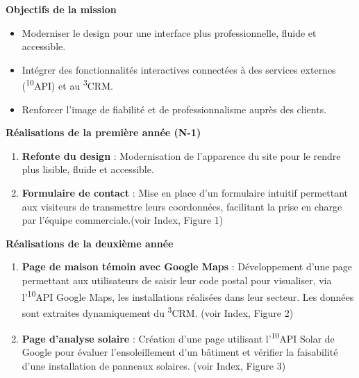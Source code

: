 \textbf{Objectifs de la mission}\vspace{0.3cm}

\begin{itemize}
    \item Moderniser le design pour une interface plus professionnelle, fluide et accessible.\vspace{0.3cm}
    \item Intégrer des fonctionnalités interactives connectées à des services externes (\textsuperscript{10}API) et au \textsuperscript{3}CRM.\vspace{0.3cm}
    \item Renforcer l’image de fiabilité et de professionnalisme auprès des clients.\vspace{0.3cm}
\end{itemize}

\textbf{Réalisations de la première année (N-1)}\vspace{0.3cm}

\begin{enumerate}
    \item \textbf{Refonte du design} : Modernisation de l’apparence du site pour le rendre plus lisible, fluide et accessible.\vspace{0.3cm}
    \item \textbf{Formulaire de contact} : Mise en place d’un formulaire intuitif permettant aux visiteurs de transmettre leurs coordonnées, facilitant la prise en charge par l’équipe commerciale.(voir Index, Figure 1)\vspace{0.3cm}
\end{enumerate}

\textbf{Réalisations de la deuxième année}\vspace{0.3cm}

\begin{enumerate}
    \item \textbf{Page de maison témoin avec Google Maps} : Développement d’une page permettant aux utilisateurs de saisir leur code postal pour visualiser, via l’\textsuperscript{10}API Google Maps, les installations réalisées dans leur secteur. Les données sont extraites dynamiquement du \textsuperscript{3}CRM. (voir Index, Figure 2)\vspace{0.3cm}
    \item \textbf{Page d’analyse solaire} : Création d’une page utilisant l’\textsuperscript{10}API Solar de Google pour évaluer l’ensoleillement d’un bâtiment et vérifier la faisabilité d’une installation de panneaux solaires. (voir Index, Figure 3)\vspace{0.3cm}
\end{enumerate}

